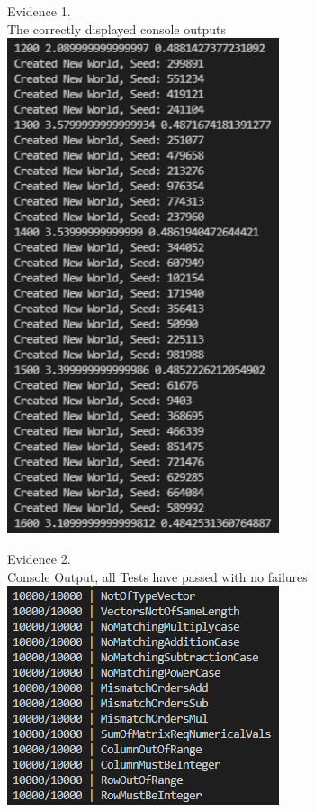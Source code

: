 \begin{flushleft}
\begin{center}
        {\large Evidence 1.\rn } \\ 
        \vspace{0.3cm}
        The correctly displayed console outputs \\
        \includegraphics[width=8cm]{Images/Testing/T1.10.1.PNG} \\
    \end{center}

    \setcounter{magicrownumbers}{0}
    \begin{center}
        {\large Evidence 2.\rn } \\ 
        \vspace{0.3cm}
        Console Output, all Tests have passed with no failures \\
        \includegraphics[4cm]{Images/Testing/T2.19.1.PNG} \\
        \vspace{1cm}


\end{center}
\end{flushleft}
